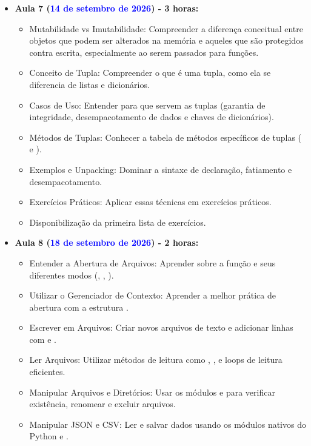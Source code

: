 \begin{itemize}
    \item \textbf{Aula 7 (\textcolor{blue}{14 de setembro de 2026}) - 3 horas:}
    \begin{itemize}\justifying
        \item Mutabilidade vs Imutabilidade: Compreender a diferença conceitual entre objetos que podem ser alterados na memória e aqueles que são protegidos contra escrita, especialmente ao serem passados para funções.
        \item Conceito de Tupla: Compreender o que é uma tupla, como ela se diferencia de listas e dicionários.
        \item Casos de Uso: Entender para que servem as tuplas (garantia de integridade, desempacotamento de dados e chaves de dicionários).
        \item Métodos de Tuplas: Conhecer a tabela de métodos específicos de tuplas ( e ).
        \item Exemplos e Unpacking: Dominar a sintaxe de declaração, fatiamento e desempacotamento.
        \item Exercícios Práticos: Aplicar essas técnicas em exercícios práticos.
        \item Disponibilização da primeira lista de exercícios.
    \end{itemize}

    \item \textbf{Aula 8 (\textcolor{blue}{18 de setembro de 2026}) - 2 horas:}
    \begin{itemize}\justifying
        \item Entender a Abertura de Arquivos: Aprender sobre a função  e seus diferentes modos (, , ).
        \item Utilizar o Gerenciador de Contexto: Aprender a melhor prática de abertura com a estrutura .
        \item Escrever em Arquivos: Criar novos arquivos de    texto e adicionar linhas com  e .
        \item Ler Arquivos: Utilizar métodos de leitura como , ,  e loops de leitura eficientes.
        \item Manipular Arquivos e Diretórios: Usar os módulos  e  para verificar existência, renomear e excluir arquivos.
        \item Manipular JSON e CSV: Ler e salvar dados usando os módulos nativos do Python  e .
    \end{itemize}


\end{itemize}
